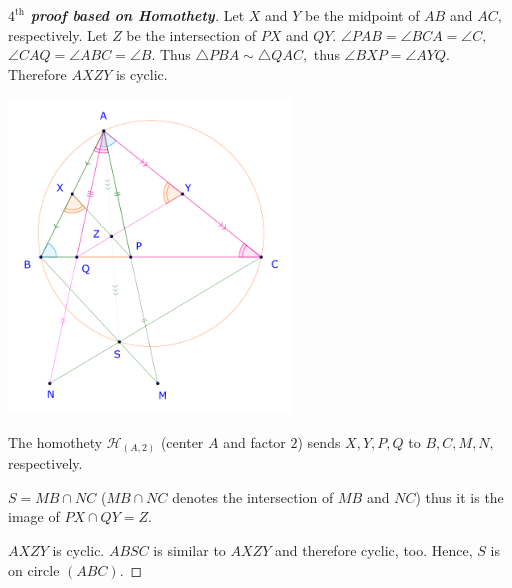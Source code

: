 \documentclass{article}
\begin{document}
\newpage

\begin{proof}[\textbf{$4^{\text{th}}$ proof based on Homothety}]
    Let $X$ and $Y$ be the midpoint of $AB$ and $AC,$ respectively.
    Let $Z$ be the intersection of $PX$ and $QY.$
    $\angle PAB = \angle BCA = \angle C,$ $\angle CAQ = \angle ABC = \angle B.$
    Thus $\triangle PBA \sim \triangle QAC,$ thus $\angle BXP = \angle AYQ.$
    Therefore $AXZY$ is cyclic.

    \begin{center}
        \includegraphics[width=7.5cm]{./svg/pdf/ot-22-23-4-e2-s2.pdf}
    \end{center}
    
    The homothety $\mathcal{H}_{(A, 2)}$ (center $A$ and factor $2$) sends $X, Y, P, Q$ to $B, C, M, N,$ respectively.

    $S = MB \cap NC$ ($MB \cap NC$ denotes the intersection of $MB$ and $NC$) thus it is the image of $PX \cap QY = Z.$

    $AXZY$ is cyclic. $ABSC$ is similar to $AXZY$ and therefore cyclic, too. Hence, $S$ is on circle $(ABC).$
\end{proof}
\end{document}
